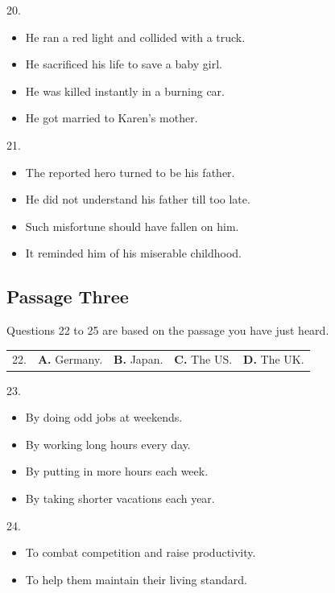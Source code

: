 \documentclass[UTF8,11pt]{ctexart}
\begin{document}
20.


\begin{itemize}[leftmargin=2em,itemsep=.2em,topsep=.4em]\item[A.] He ran a red light and collided with a truck.
\item[B.] He sacrificed his life to save a baby girl.
\item[C.] He was killed instantly in a burning car.
\item[D.] He got married to Karen’s mother.
\end{itemize}

21.


\begin{itemize}[leftmargin=2em,itemsep=.2em,topsep=.4em]\item[A.] The reported hero turned to be his father.
\item[B.] He did not understand his father till too late.
\item[C.] Such misfortune should have fallen on him.
\item[D.] It reminded him of his miserable childhood.
\end{itemize}

\subsection*{\textbf{Passage Three}}


Questions 22 to 25 are based on the passage you have just heard.


\noindent\begin{tabularx}{\linewidth}{@{}lXXXX@{}}22. & \textbf{A.} Germany. & \textbf{B.} Japan. & \textbf{C.} The US. & \textbf{D.} The UK.\\\end{tabularx}\par

23.


\begin{itemize}[leftmargin=2em,itemsep=.2em,topsep=.4em]\item[A.] By doing odd jobs at weekends.
\item[B.] By working long hours every day.
\item[C.] By putting in more hours each week.
\item[D.] By taking shorter vacations each year.
\end{itemize}

24.


\begin{itemize}[leftmargin=2em,itemsep=.2em,topsep=.4em]\item[A.] To combat competition and raise productivity.
\item[C.] To help them maintain their living standard.
\end{itemize}
\end{document}
